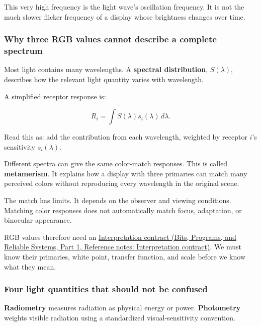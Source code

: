 This very high frequency is the light wave's oscillation frequency. It is not the much slower flicker frequency of a display whose brightness changes over time.

\subsubsection{Why three RGB values cannot describe a complete spectrum}\label{04-visual-computing-ii-ch043-why-three-rgb-values-cannot-describe-a-complete-spectrum}

\hypertarget{04-visual-computing-ii-ch043-why-three-rgb-values-cannot-describe-a-complete-spectrum}{}

Most light contains many wavelengths. A \textbf{spectral distribution}, \(S(\lambda)\), describes how the relevant light quantity varies with wavelength.

A simplified receptor response is:

\[
R_i=\int S(\lambda)s_i(\lambda)\,d\lambda.
\]

Read this as: add the contribution from each wavelength, weighted by receptor \(i\)'s sensitivity \(s_i(\lambda)\).

Different spectra can give the same color-match responses. This is called \textbf{metamerism}. It explains how a display with three primaries can match many perceived colors without reproducing every wavelength in the original scene.

The match has limits. It depends on the observer and viewing conditions. Matching color responses does not automatically match focus, adaptation, or binocular appearance.

RGB values therefore need an \href{../01-Bits-Programs-and-Reliable-Systems-P01/main.pdf\#nameddest=appendix-f414bd4ed05c}{Interpretation contract (Bits, Programs, and Reliable Systems, Part 1, Reference notes: Interpretation contract)}. We must know their primaries, white point, transfer function, and scale before we know what they mean.

\subsubsection{Four light quantities that should not be confused}\label{04-visual-computing-ii-ch043-four-light-quantities-that-should-not-be-confused}

\hypertarget{04-visual-computing-ii-ch043-four-light-quantities-that-should-not-be-confused}{}

\textbf{Radiometry} measures radiation as physical energy or power. \textbf{Photometry} weights visible radiation using a standardized visual-sensitivity convention.

